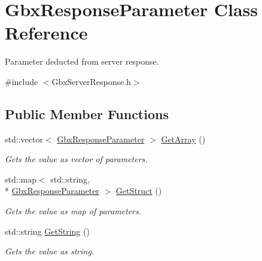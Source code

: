 \hypertarget{classGbxResponseParameter}{\section{Gbx\-Response\-Parameter Class Reference}
\label{classGbxResponseParameter}
}


Parameter deducted from server response.  




{\ttfamily \#include $<$Gbx\-Server\-Response.\-h$>$}

\subsection*{Public Member Functions}
\begin{DoxyCompactItemize}
\item 
std\-::vector$<$ \hyperlink{classGbxResponseParameter}{Gbx\-Response\-Parameter} $>$ \hyperlink{classGbxResponseParameter_aa27aca1d5084755fe585401617e2549a}{Get\-Array} ()
\begin{DoxyCompactList}\small\item\em Gets the value as vector of parameters. \end{DoxyCompactList}\item 
std\-::map$<$ std\-::string, \\*
\hyperlink{classGbxResponseParameter}{Gbx\-Response\-Parameter} $>$ \hyperlink{classGbxResponseParameter_ab6af5e0662d7d832b7606e9e0f461f22}{Get\-Struct} ()
\begin{DoxyCompactList}\small\item\em Gets the value as map of parameters. \end{DoxyCompactList}\item 
std\-::string \hyperlink{classGbxResponseParameter_a014af0f74e937d9002cda3e6e791735b}{Get\-String} ()
\begin{DoxyCompactList}\small\item\em Gets the value as string. \end{DoxyCompactList}\end{DoxyCompactItemize}
